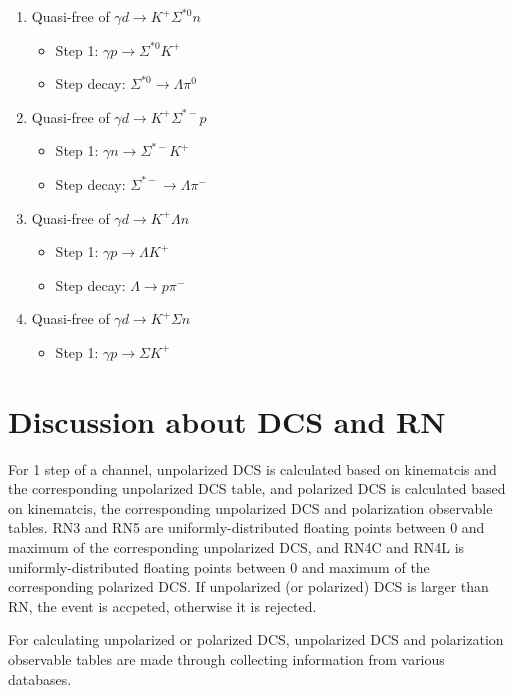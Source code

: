 \documentclass[a4paper]{article}
\begin{document}
\begin{enumerate}
\item Quasi-free of $\gamma d\rightarrow K^+\Sigma^{*0} n$
  \begin{itemize}
  \item Step 1: $\gamma p\rightarrow \Sigma^{*0} K^+$
  \item Step decay: $\Sigma^{*0}\rightarrow \Lambda\pi^0$
  \end{itemize}

\item Quasi-free of $\gamma d\rightarrow K^+\Sigma^{*-} p$
  \begin{itemize}
  \item Step 1: $\gamma n\rightarrow \Sigma^{*-} K^+$
  \item Step decay: $\Sigma^{*-}\rightarrow \Lambda\pi^-$
  \end{itemize}

\item Quasi-free of $\gamma d\rightarrow K^+\Lambda n$
 \begin{itemize}
  \item Step 1: $\gamma p\rightarrow  \Lambda K^+$
  \item Step decay: $\Lambda\rightarrow p \pi^-$
  \end{itemize}

\item Quasi-free of $\gamma d\rightarrow K^+\Sigma n$
  \begin{itemize}
  \item Step 1: $\gamma p\rightarrow  \Sigma K^+$
  \end{itemize}

\end{enumerate}


\section{Discussion about DCS and RN}
For 1 step of a channel, unpolarized DCS is calculated based on kinematcis and the corresponding unpolarized DCS table, and polarized DCS is calculated based on kinematcis, the corresponding unpolarized DCS and polarization observable tables. RN3 and RN5 are uniformly-distributed floating points between 0 and maximum of the corresponding unpolarized DCS, and RN4C and RN4L is uniformly-distributed floating points between 0 and maximum of the corresponding polarized DCS. If unpolarized (or polarized) DCS is larger than RN, the event is accpeted, otherwise it is rejected.

For calculating unpolarized or polarized DCS, unpolarized DCS and polarization observable tables are made through collecting information from various databases.
\end{document}
